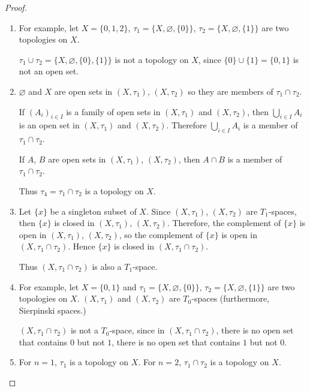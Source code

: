 \begin{proof}
    \begin{enumerate}[label={(\roman*)}]
        \item For example, let $X = \{ 0, 1, 2 \}$, $\tau_{1} = \{ X, \varnothing, \{ 0 \} \}$, $\tau_{2} = \{ X, \varnothing, \{ 1 \} \}$ are two topologies on $X$.

              $\tau_{1}\cup\tau_{2} = \{ X, \varnothing, \{ 0 \}, \{ 1 \} \}$ is not a topology on $X$, since $\{ 0 \}\cup \{ 1 \} = \{ 0, 1 \}$ is not an open set.
        \item $\varnothing$ and $X$ are open sets in $(X, \tau_{1})$, $(X, \tau_{2})$ so they are members of $\tau_{1}\cap \tau_{2}$.

              If ${(A_{i})}_{i\in I}$ is a family of open sets in $(X, \tau_{1})$ and $(X, \tau_{2})$, then $\bigcup_{i\in I} A_{i}$ is an open set in $(X, \tau_{1})$ and $(X, \tau_{2})$. Therefore $\bigcup_{i\in I} A_{i}$ is a member of $\tau_{1}\cap\tau_{2}$.

              If $A$, $B$ are open sets in $(X, \tau_{1})$, $(X, \tau_{2})$, then $A\cap B$ is a member of $\tau_{1}\cap \tau_{2}$.

              Thus $\tau_{4} = \tau_{1}\cap\tau_{2}$ is a topology on $X$.
        \item Let $\{ x \}$ be a singleton subset of $X$. Since $(X, \tau_{1})$, $(X, \tau_{2})$ are $T_{1}$-spaces, then $\{ x \}$ is closed in $(X, \tau_{1})$, $(X, \tau_{2})$. Therefore, the complement of $\{ x \}$ is open in $(X, \tau_{1})$, $(X, \tau_{2})$, so the complement of $\{ x \}$ is open in $(X, \tau_{1}\cap \tau_{2})$. Hence $\{x \}$ is closed in $(X, \tau_{1}\cap\tau_{2})$.

              Thus $(X, \tau_{1}\cap\tau_{2})$ is also a $T_{1}$-space.
        \item For example, let $X = \{ 0, 1 \}$ and $\tau_{1} = \{ X, \varnothing, \{ 0 \} \}$, $\tau_{2} = \{ X, \varnothing, \{ 1 \} \}$ are two topologies on $X$. $(X, \tau_{1})$ and $(X, \tau_{2})$ are $T_{0}$-spaces (furthermore, Sierpinski spaces.)

              $(X, \tau_{1}\cap \tau_{2})$ is not a $T_{0}$-space, since in $(X, \tau_{1}\cap\tau_{2})$, there is no open set that contains $0$ but not $1$, there is no open set that contains $1$ but not $0$.
        \item For $n = 1$, $\tau_{1}$ is a topology on $X$. For $n = 2$, $\tau_{1}\cap\tau_{2}$ is a topology on $X$.


\end{enumerate}
\end{proof}
